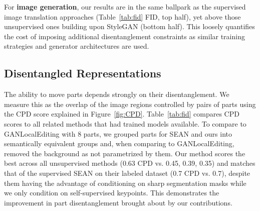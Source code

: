 \documentclass[10pt, conference, compsocconf]{IEEEtran}
\begin{document}
For \textbf{image generation}, our results are in the same ballpark as the supervised image translation approaches (Table~\ref{tab:fid} FID, top half), yet above those unsupervised ones building upon StyleGAN (bottom half). This loosely quantifies the cost of imposing additional disentanglement constraints as similar training strategies and generator architectures are used.  

\subsection{Disentangled Representations} \label{disentangled_representations}
The ability to move parts depends strongly on their disentanglement. 
We measure this as the overlap of the image regions controlled by pairs of parts using the CPD score explained in Figure~\ref{fig:CPD}. Table~\ref{tab:fid} compares CPD scores to all related methods that had trained models available. 
To compare to GANLocalEditing \cite{collins2020editing} with 8 parts, we grouped parts for SEAN and ours into semantically equivalent groups and, when comparing to GANLocalEditing, removed the background as not parametrized by them. Our method scores the best across all unsupervised methods (0.63 CPD vs. 0.45, 0.39, 0.35) and matches that of the supervised SEAN on their labeled dataset (0.7 CPD vs. 0.7), despite them having the advantage of conditioning on sharp segmentation masks while we only condition on self-supervised keypoints. This demonstrates the improvement in part disentanglement brought about by our contributions.
\end{document}
